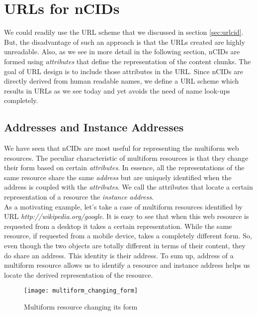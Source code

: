 \section{URLs for nCIDs}
We could readily use the URL scheme that we discussed in section
\ref{sec:urlcid}. But, the disadvantage of such an approach is that
the URLs created are highly unreadable. Also, as we see in more detail
in the following section, nCIDs are formed using \emph{attributes}
that define the representation of the content chunks. The goal of URL
design is to include those attributes in the URL. Since nCIDs are
directly derived from human readable names, we define a URL scheme
which results in URLs as we see today and yet avoids the need of name
look-ups completely.

\subsection{Addresses and Instance Addresses}
\label{sec:addrnloc}
We have seen that nCIDs are most useful for representing the multiform
web resources. The peculiar characteristic of multiform resources is
that they change their form based on certain \emph{attributes}. In
essence, all the representations of the same resource share the same
\emph{address} but are uniquely identified when the address is coupled
with the \emph{attributes}. We call the attributes that locate a
certain representation of a resource the \emph{instance address}.\\ As
a motivating example, let's take a case of multiform resources
identified by URL \emph{http://wikipedia.org/google}. It is easy to
see that when this web resource is requested from a desktop it takes a
certain representation. While the same resource, if requested from a
mobile device, takes a completely different form. So, even though the
two objects are totally different in terms of their content, they do
share an address. This identity is their address. To sum up, address
of a multiform resource allows us to identify a resource and instance
address helps us locate the derived representation of the resource.
\begin{figure}
  \begin{center}
    \texttt{[image: multiform\_changing\_form]}
    \caption{Multiform resource changing its form}
    \label{fig:multiform-change}
  \end{center}
\end{figure}

